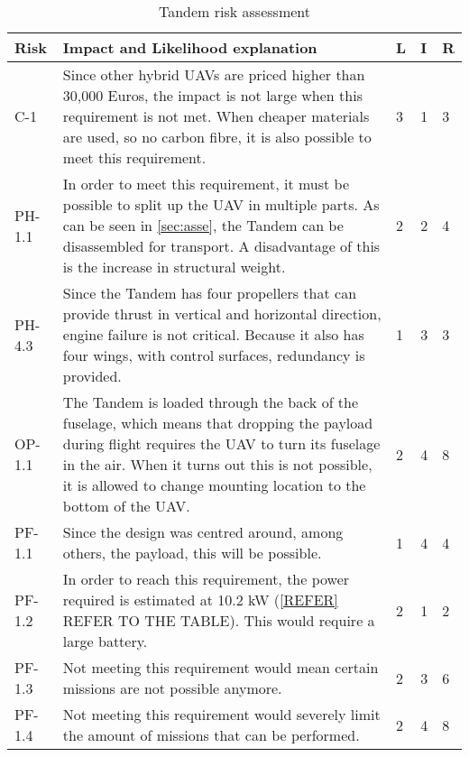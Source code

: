 \begin{table}[]
    \centering
    \caption{Tandem risk assessment}
    \label{tab:tand_risk_asse}
    \begin{tabularx}{\textwidth}{l L l l l}
        \toprule
        Risk            & Impact and Likelihood explanation                & L     & I     & R
        \\ \midrule
        C-1             & Since other hybrid UAVs are priced higher than 30,000 Euros\footnotemark, the impact is not large when this requirement is not met. When cheaper materials are used, so no carbon fibre, it is also possible to meet this requirement.                                & 3      & 1     & 3
        \\ \hdashline
        PH-1.1          & In order to meet this requirement, it must be possible to split up the UAV in multiple parts. As can be seen in \autoref{sec:asse},%
        the Tandem can be disassembled for transport. A disadvantage of this is the increase in structural weight.                 & 2     & 2     & 4
        \\ \hdashline
        PH-4.3          & Since the Tandem has four propellers that can provide thrust in vertical and horizontal direction, engine failure is not critical. Because it also has four wings, with control surfaces, redundancy is provided.                                         & 1         & 3     & 3
        \\ \hdashline
        OP-1.1          & The Tandem is loaded through the back of the fuselage, which means that dropping the payload during flight requires the UAV to turn its fuselage in the air. When it turns out this is not possible, it is allowed to change mounting location to the bottom of the UAV.       & 2 & 4 & 8
        \\ \hdashline
        PF-1.1          & Since the design was centred around, among others, the payload, this will be possible.          & 1 & 4 & 4
        \\ \hdashline
        PF-1.2          & In order to reach this requirement, the power required is estimated at 10.2 kW (\autoref{REFER} REFER TO THE TABLE). This would require a large battery.       & 2     & 1     & 2
        \\ \hdashline
        PF-1.3          & Not meeting this requirement would mean certain missions are not possible anymore.    & 2 & 3 & 6
        \\ \hdashline
        PF-1.4          & Not meeting this requirement would severely limit the amount of missions that can be performed.          & 2 & 4 & 8

\end{tabularx}
\end{table}
